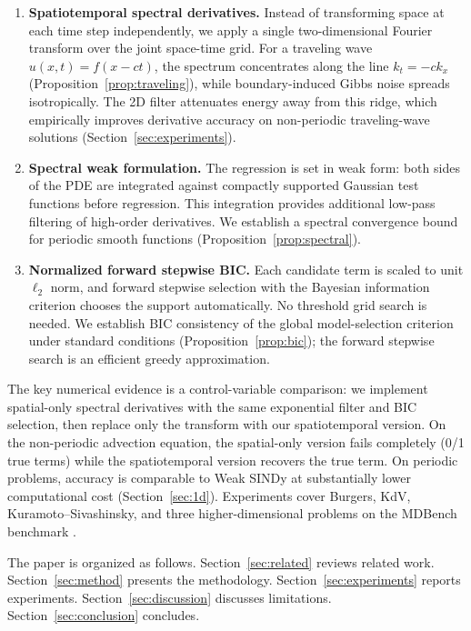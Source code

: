 \documentclass[preprint,12pt]{elsarticle}
\begin{document}
\begin{enumerate}
\item \textbf{Spatiotemporal spectral derivatives.} Instead of transforming space at each time step independently, we apply a single two-dimensional Fourier transform over the joint space-time grid. For a traveling wave $u(x,t)=f(x-ct)$, the spectrum concentrates along the line $k_t=-ck_x$ (Proposition~\ref{prop:traveling}), while boundary-induced Gibbs noise spreads isotropically. The 2D filter attenuates energy away from this ridge, which empirically improves derivative accuracy on non-periodic traveling-wave solutions (Section~\ref{sec:experiments}).

\item \textbf{Spectral weak formulation.} The regression is set in weak form: both sides of the PDE are integrated against compactly supported Gaussian test functions before regression. This integration provides additional low-pass filtering of high-order derivatives. We establish a spectral convergence bound for periodic smooth functions (Proposition~\ref{prop:spectral}).

\item \textbf{Normalized forward stepwise BIC.} Each candidate term is scaled to unit $\ell_2$ norm, and forward stepwise selection with the Bayesian information criterion \cite{schwarz1978estimating} chooses the support automatically. No threshold grid search is needed. We establish BIC consistency of the global model-selection criterion under standard conditions (Proposition~\ref{prop:bic}); the forward stepwise search is an efficient greedy approximation.
\end{enumerate}

The key numerical evidence is a control-variable comparison: we implement spatial-only spectral derivatives with the same exponential filter and BIC selection, then replace only the transform with our spatiotemporal version. On the non-periodic advection equation, the spatial-only version fails completely (0/1 true terms) while the spatiotemporal version recovers the true term. On periodic problems, accuracy is comparable to Weak SINDy at substantially lower computational cost (Section~\ref{sec:1d}). Experiments cover Burgers, KdV, Kuramoto--Sivashinsky, and three higher-dimensional problems on the MDBench benchmark \cite{ziaei2025mdbench}.

The paper is organized as follows. Section~\ref{sec:related} reviews related work. Section~\ref{sec:method} presents the methodology. Section~\ref{sec:experiments} reports experiments. Section~\ref{sec:discussion} discusses limitations. Section~\ref{sec:conclusion} concludes.
\end{document}
